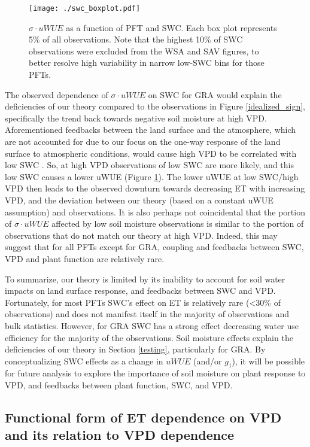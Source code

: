 \documentclass[draft,linenumbers]{agujournal}
\begin{document}
\begin{figure}
  \centering
  \centerline{\texttt{[image: ./swc\_boxplot.pdf]}}
  \caption{$\sigma \cdot uWUE$ as a function of PFT and SWC. Each box
    plot represents 5\% of all observations. Note that the highest
    10\% of SWC observations were excluded from the WSA and SAV
    figures, to better resolve high variability in narrow low-SWC bins
    for those PFTs.}
  \label{swc_boxplot}
\end{figure}

The observed dependence of $\sigma \cdot uWUE$ on SWC for GRA would
explain the deficiencies of our theory compared to the observations in
Figure \ref{idealized_sign}, specifically the trend back towards
negative soil moisture at high VPD. Aforementioned feedbacks between
the land surface and the atmosphere, which are not accounted for due
to our focus on the one-way response of the land surface to
atmospheric conditions, would cause high VPD to be correlated with low
SWC \citep[][]{Gentine_2016, Berg_2016}. So, at high VPD observations
of low SWC are more likely, and this low SWC causes a lower uWUE
(Figure \ref{swc_boxplot}). The lower uWUE at low SWC/high VPD then
leads to the observed downturn towards decreasing ET with increasing
VPD, and the deviation between our theory (based on a constant uWUE
assumption) and observations. It is also perhaps not coincidental that
the portion of $\sigma \cdot uWUE$ affected by low soil moisture
observations is similar to the portion of observations that do not
match our theory at high VPD. Indeed, this may suggest that for all PFTs
except for GRA, coupling and feedbacks between SWC, VPD and plant
function are relatively rare. 

To summarize, our theory is limited by its inability to account for
soil water impacts on land surface response, and feedbacks between SWC
and VPD. Fortunately, for most PFTs SWC's effect on ET is relatively
rare (<30\% of observations) and does not manifest itself in the
majority of observations and bulk statistics. However, for GRA SWC has
a strong effect decreasing water use efficiency for the majority of
the observations. Soil moisture effects explain the deficiencies of
our theory in Section \ref{testing}, particularly for GRA. By
conceptualizing SWC effects as a change in $uWUE$ (and/or $g_1$), it
will be possible for future analysis to explore the importance of soil
moisture on plant response to VPD, and feedbacks between plant
function, SWC, and VPD.

\subsection{Functional form of ET dependence on VPD and its relation
  to VPD dependence}
\label{functional_form}
\end{document}
